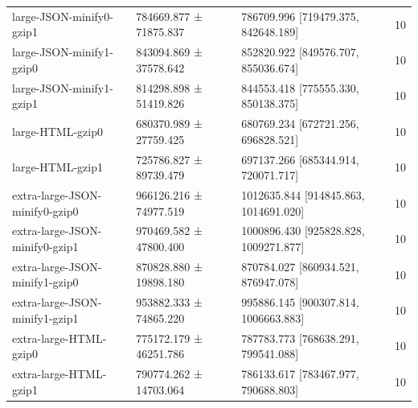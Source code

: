 \begin{tabular}{lllr}
large-JSON-minify0-gzip1 & 784669.877 ± 71875.837 & 786709.996 [719479.375, 842648.189] & 10 \\
large-JSON-minify1-gzip0 & 843094.869 ± 37578.642 & 852820.922 [849576.707, 855036.674] & 10 \\
large-JSON-minify1-gzip1 & 814298.898 ± 51419.826 & 844553.418 [775555.330, 850138.375] & 10 \\
large-HTML-gzip0 & 680370.989 ± 27759.425 & 680769.234 [672721.256, 696828.521] & 10 \\
large-HTML-gzip1 & 725786.827 ± 89739.479 & 697137.266 [685344.914, 720071.717] & 10 \\
extra-large-JSON-minify0-gzip0 & 966126.216 ± 74977.519 & 1012635.844 [914845.863, 1014691.020] & 10 \\
extra-large-JSON-minify0-gzip1 & 970469.582 ± 47800.400 & 1000896.430 [925828.828, 1009271.877] & 10 \\
extra-large-JSON-minify1-gzip0 & 870828.880 ± 19898.180 & 870784.027 [860934.521, 876947.078] & 10 \\
extra-large-JSON-minify1-gzip1 & 953882.333 ± 74865.220 & 995886.145 [900307.814, 1006663.883] & 10 \\
extra-large-HTML-gzip0 & 775172.179 ± 46251.786 & 787783.773 [768638.291, 799541.088] & 10 \\
extra-large-HTML-gzip1 & 790774.262 ± 14703.064 & 786133.617 [783467.977, 790688.803] & 10 \\
\bottomrule
\end{tabular}
